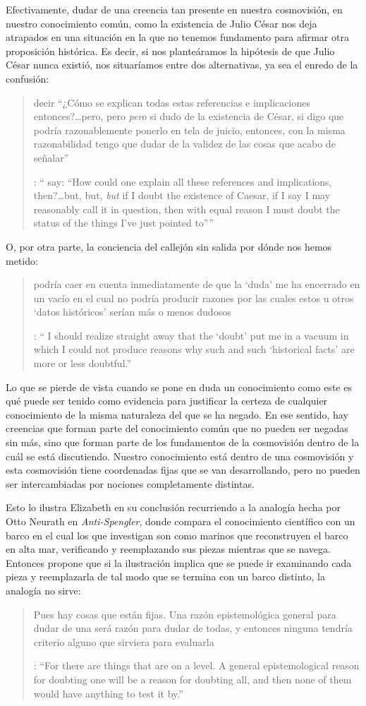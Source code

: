 Efectivamente, dudar de una creencia tan presente en nuestra cosmovisión, en nuestro conocimiento común, como la existencia de Julio César nos deja atrapados en una situación en la que no tenemos fundamento para afirmar otra proposición histórica. Es decir, si nos planteáramos la hipótesis de que Julio César nunca existió, nos situaríamos entre dos alternativas, ya sea el enredo de la confusión: \blockquote[{\cite[91]{anscombe1981parmenides:humeandjulius}}: \enquote{\textelp{} say: ``How could one explain all these references and implications, then?\ldots but, but, \emph{but} if I doubt the existence of Caesar, if I say I may reasonably call it in question, then with equal reason I must doubt the status of the things I've just pointed to''}]{\textelp{} decir ``¿Cómo se explican todas estas referencias e implicaciones entonces?\ldots pero, pero \emph{pero} si dudo de la existencia de César, si digo que podría razonablemente ponerlo en tela de juicio, entonces, con la misma razonabilidad tengo que dudar de la validez de las cosas que acabo de señalar''}. O, por otra parte, la conciencia del callejón sin salida por dónde nos hemos metido: \blockquote[{\cite[91]{anscombe1981parmenides:humeandjulius}}: \enquote{\textelp{} I should realize straight away that the `doubt' put me in a vacuum in which I could not produce reasons why such and such `historical facts' are more or less doubtful.}]{\textelp{} podría caer en cuenta inmediatamente de que la `duda' me ha encerrado en un vacío en el cual no podría producir razones por las cuales estos u otros `datos históricos' serían más o menos dudosos}.

Lo que se pierde de vista cuando se pone en duda un conocimiento como este es qué puede ser tenido como evidencia para justificar la certeza de cualquier conocimiento de la misma naturaleza del que se ha negado. En ese sentido, hay creencias que forman parte del conocimiento común que no pueden ser negadas sin más, sino que forman parte de los fundamentos de la cosmovisión dentro de la cuál se está discutiendo. Nuestro conocimiento está dentro de una cosmovisión y esta cosmovisión tiene coordenadas fijas que se van desarrollando, pero no pueden ser intercambiadas por nociones completamente distintas.

Esto lo ilustra Elizabeth en su conclusión recurriendo a la analogía hecha por Otto Neurath en \emph{Anti-Spengler}, donde compara el conocimiento científico con un barco en el cual los que investigan son como marinos que reconstruyen el barco en alta mar, verificando y reemplazando sus piezas mientras que se navega. Entonces propone que si la ilustración implica que se puede ir examinando cada pieza y reemplazarla de tal modo que se termina con un barco distinto, la analogía no sirve: \blockquote[{\cite[92]{anscombe1981parmenides:humeandjulius}}: \enquote{For there are things that are on a level. A general epistemological reason for doubting one will be a reason for doubting all, and then none of them would have anything to test it by.}]{Pues hay cosas que están fijas. Una razón epistemológica general para dudar de una será razón para dudar de todas, y entonces ninguna tendría criterio alguno que sirviera para evaluarla}.
